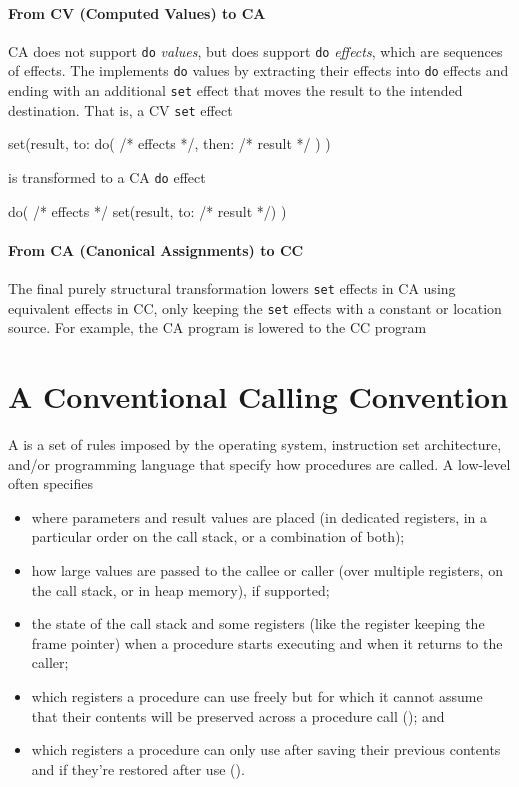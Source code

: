 \documentclass[main.tex]{subfiles}
\begin{document}
\paragraph{From CV (Computed Values) to CA} CA does not support \texttt{do} \emph{values}, but does support \texttt{do} \emph{effects}, which are sequences of effects. The  implements \texttt{do} values by extracting their effects into \texttt{do} effects and ending with an additional \texttt{set} effect that moves the result to the intended destination. That is, a CV \texttt{set} effect
\begin{il}
	set(result, to:
		do(
			/* effects */,
			then: /* result */
		)
	)
\end{il}
is transformed to a CA \texttt{do} effect
\begin{il}
	do(
		/* effects */
		set(result, to: /* result */)
	)
\end{il}

\paragraph{From CA (Canonical Assignments) to CC} The final purely structural transformation lowers \texttt{set} effects in CA using equivalent effects in CC, only keeping the \texttt{set} effects with a constant or location source. For example, the CA program
is lowered to the CC program

\section{A Conventional Calling Convention} \label{sct:cc}
A  is a set of rules imposed by the operating system, instruction set architecture, and/or programming language that specify how procedures are called. A low-level  often specifies
\begin{itemize}[noitemsep]
	\item where parameters and result values are placed (in dedicated registers, in a particular order on the call stack, or a combination of both);
	\item how large values are passed to the callee or caller (over multiple registers, on the call stack, or in heap memory), if supported;
	\item the state of the call stack and some registers (like the register keeping the frame pointer) when a procedure starts executing and when it returns to the caller;
	\item which registers a procedure can use freely but for which it cannot assume that their contents will be preserved across a procedure call (\textbf{}); and
	\item which registers a procedure can only use after saving their previous contents and if they're restored after use (\textbf{}).
\end{itemize}
\end{document}
